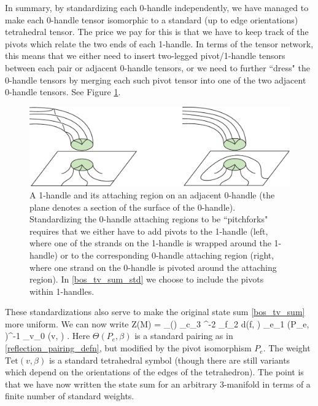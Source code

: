 In summary, by standardizing each 0-handle independently, we have managed to make each
0-handle tensor isomorphic to a standard (up to edge orientations) tetrahedral tensor.
The price we pay for this is that we have to keep track of the pivots which relate the two ends of each 1-handle.
In terms of the tensor network, this means that we either need to insert two-legged pivot/1-handle tensors between each pair
or adjacent 0-handle tensors, or we need to further ``dress" the 0-handle tensors by merging each such pivot tensor
into one of the two adjacent 0-handle tensors.
See Figure \ref{OneHandlevsTetPivot}.
\begin{figure} 
\begin{centering} 
\includegraphics[scale=0.6]{OneHandlevsTetPivot.pdf} 
\caption{\label{OneHandlevsTetPivot}
 A 1-handle and its attaching region on an adjacent 0-handle (the plane denotes a section of the surface of the 0-handle).
Standardizing the 0-handle attaching regions to be ``pitchforks" requires that we either have to add pivots to the 1-handle (left, where one of the strands on the 1-handle is wrapped around the 1-handle) or to the corresponding 0-handle attaching region (right, where one strand on the 0-handle is pivoted around the attaching region). 
In \eqref{bos_tv_sum_std} we choose to include the pivots within 1-handles.}
\end{centering} 
\end{figure} 

\medskip

These standardizations also serve to make the original state sum \eqref{bos_tv_sum} more uniform.
We can now write
\be \label{bos_tv_sum_std}
	Z(M) = \sum_{\beta\in\mcl(\mch)}
		\prod_{c\in\mch_3} \mcd^{-2}
		\prod_{f\in\mch_2} d(f, \beta)
		\prod_{e\in\mch_1} \Theta(P_e, \beta)^{-1}
		\prod_{v\in\mch_0} (v, \beta) .
\ee
Here $\Theta(P_e, \beta)$ is a standard pairing as in \eqref{reflection_pairing_defn}, but modified by the pivot isomorphism $P_e$.
The weight $\text{Tet}(v, \beta)$ is a standard tetrahedral symbol (though there are still variants which depend on
the orientations of the edges of the tetrahedron).
The point is that we have now written the state sum for an arbitrary 3-manifold in terms of a finite number
of standard weights.



